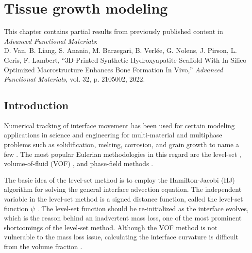 \chapter{Tissue growth modeling}\label{ch:tissue}

\begin{shaded}
This chapter contains partial results from previously published content in \textit{Advanced Functional Materials}:\\
D. Van, B. Liang, S. Anania, M. Barzegari, B. Verlée, G. Nolens, J. Pirson, L. Geris, F. Lambert, ``3D-Printed Synthetic Hydroxyapatite Scaffold With In Silico Optimized Macrostructure Enhances Bone Formation In Vivo,'' \textit{Advanced Functional Materials}, vol. 32, p. 2105002, 2022.
\end{shaded}


\section{Introduction}

Numerical tracking of interface movement has been used for certain modeling applications in science and engineering for multi-material and multiphase problems such as solidification, melting, corrosion, and grain growth to name a few \cite{Sun2007}. The most popular Eulerian methodologies in this regard are the level-set \cite{Osher1988,Andrew2000,RonaldFedkiw2002}, volume-of-fluid (VOF) \cite{Rider1998}, and phase-field methods \cite{Boettinger2002,Bellemans2017}. 


The basic idea of the level-set method is to employ the Hamilton-Jacobi (HJ) algorithm for solving the general interface advection equation. The independent variable in the level-set method is a signed distance function, called the level-set function $\psi$ \cite{RonaldFedkiw2002}. The level-set function should be re-initialized as the interface evolves, which is the reason behind an inadvertent mass loss, one of the most prominent shortcomings of the level-set method. Although the VOF method is not vulnerable to the mass loss issue, calculating the interface curvature is difficult from the volume fraction \cite{Sun2007}. 

